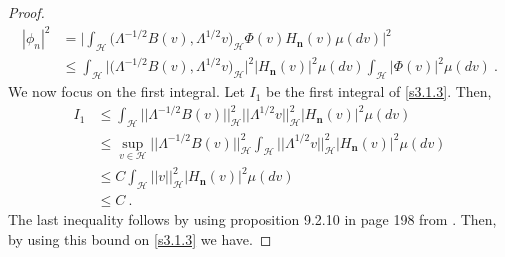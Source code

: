 \documentclass[review,onefignum,onetabnum]{siamart190516}
\begin{document}
\begin{proof}
\begin{equation}
            \label{s3.1.3}
            \begin{aligned}
                |\phi_n |^2 &=
                    \Bigg|
                        \int_{\mathcal{H}}
                            \big(
                                \Lambda^{-1/2}B(v),\Lambda^{1/2}v
                            \big)_{\mathcal{H}} \Phi(v)
                            H_{\mathbf{n}}(v) \mu(dv)
                    \Bigg|^2
                    \\
                    &\le
                    \int_{\mathcal{H}}
                    \big|
                        \big(
                            \Lambda^{-1/2}B(v),\Lambda^{1/2} v
                        \big)_{\mathcal{H}}
                    \big|^2
                    \big|
                        H_{\mathbf{n}}(v)
                    \big|^2 \mu(dv)
                    \int_{\mathcal{H}}
                    \big|
                        \Phi(v)
                    \big|^2  \mu(dv)
                    \ .
             \end{aligned}
        \end{equation}
        We now focus on the first integral. Let $I_1$ be the first integral of
        \eqref{s3.1.3}. Then,
        \begin{align*}
            I_1
                &
                    \le \int_{\mathcal{H}} \big| \big| \Lambda^{-1/2} B(v)
                    \big| \big|_{\mathcal{H}}^2
                    \big| \big| 
                        \Lambda^{1/2}v 
                    \big|\big|_{\mathcal{H}}^2
                    \big|H_{\mathbf{n}}(v)\big|^2 \mu(dv)
                    \\
                &
                    \le \sup_{v\in\mathcal{H}} 
                    \big|\big|\Lambda^{-1/2}B(v)
                    \big|\big|_{\mathcal{H}}^2
                    \int_{\mathcal{H}} 
                    \big|\big|
                        \Lambda^{1/2}v 
                    \big|\big|_{\mathcal{H}}^2
                    \big|H_{\mathbf{n}}(v)\big|^2 \mu(dv)
                    \\
                & 
                    \le C \int_{\mathcal{H}} 
                    \big|\big| v \big|\big|_{\mathcal{H}}^2
                    \big|H_{\mathbf{n}}(v)\big|^2 \mu(dv)
                \\
                & 
                    \le C \ .
        \end{align*}
%
        The last inequality follows by using proposition 9.2.10 in page 198 from
        \cite{da-za1}. Then, by using this bound on \eqref{s3.1.3} we have.

\end{proof}
\end{document}
